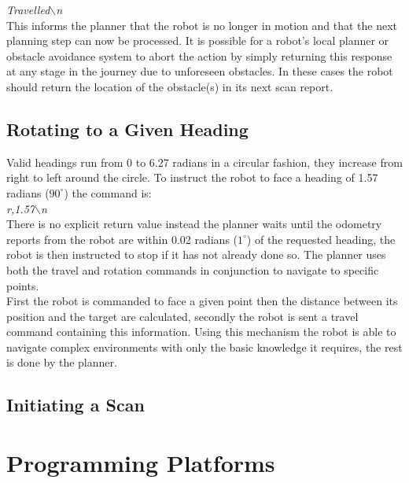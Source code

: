 \textit{Travelled$\backslash$n} \\

\noindent
This informs the planner that the robot is no longer in motion and that the next planning step can now be processed. It is possible for a robot's local planner or obstacle avoidance system to abort the action by simply returning this response at any stage in the journey due to unforeseen obstacles. In these cases the robot should return the location of the obstacle(s) in its next scan report.

\newpage

\subsection{Rotating to a Given Heading}
\noindent
Valid headings run from 0 to 6.27 radians in a circular fashion, they increase from right to left around the circle. To instruct the robot to face a heading of 1.57 radians ($90^{\circ}$) the command is: \\

\textit{r,1.57$\backslash$n} \\

\noindent
There is no explicit return value instead the planner waits until the odometry reports from the robot are within 0.02 radians ($1^{\circ}$) of the requested heading, the robot is then instructed to stop if it has not already done so. The planner uses both the travel and rotation commands in conjunction to navigate to specific points. \\

\noindent
First the robot is commanded to face a given point then the distance between its position and the target are calculated, secondly the robot is sent a travel command containing this information. Using this mechanism the robot is able to navigate complex environments with only the basic knowledge it requires, the rest is done by the planner.

\subsection{Initiating a Scan}
\noindent


\newpage


\section{Programming Platforms}


